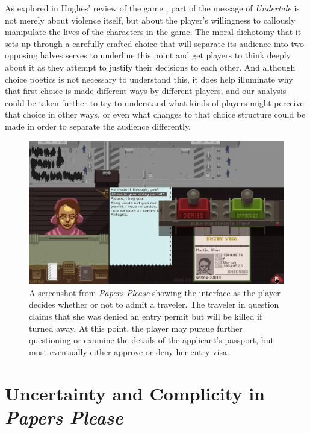 \documentclass[arts,article,submit,moreauthors,pdftex,10pt,a4paper]{Definitions/mdpi}
\begin{document}
As explored in Hughes' review of the game \citeyear{hughes2015undertale}, part of the message of \emph{Undertale} is not merely about violence itself, but about the player's willingness to callously manipulate the lives of the characters in the game.
%
The moral dichotomy that it sets up through a carefully crafted choice that will separate its audience into two opposing halves serves to underline this point and get players to think deeply about it as they attempt to justify their decisions to each other.
%
And although choice poetics is not necessary to understand this, it does help illuminate why that first choice is made different ways by different players, and our analysis could be taken further to try to understand what kinds of players might perceive that choice in other ways, or even what changes to that choice structure could be made in order to separate the audience differently.

\begin{figure}[H]
  \includegraphics[width=\textwidth]{fig/papers-please-visa-choice.png}
  \caption{A screenshot from \emph{Papers Please} showing the interface as the player decides whether or not to admit a traveler. The traveler in question claims that she was denied an entry permit but will be killed if turned away. At this point, the player may pursue further questioning or examine the details of the applicant's passport, but must eventually either approve or deny her entry visa.}
  \label{fig:PP_visa}
\end{figure}

\section{Uncertainty and Complicity in \emph{Papers Please}}
\end{document}
